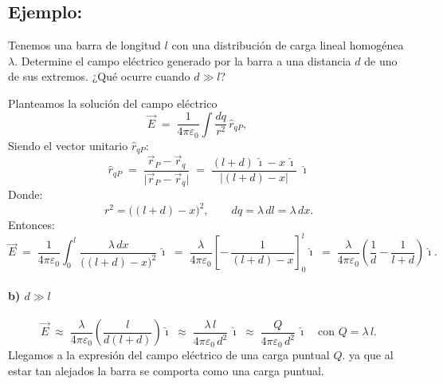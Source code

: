 \documentclass[a4paper,12pt]{article}
\begin{document}
\subsection*{Ejemplo:}

Tenemos una barra de longitud $l$ con una distribución de carga lineal homogénea $\lambda$.
Determine el campo eléctrico generado por la barra a una distancia $d$ de uno de sus extremos.
¿Qué ocurre cuando $d \gg l$?

\begin{center}
\end{center}
Planteamos la solución del campo eléctrico
\[
\vec E \;=\; \frac{1}{4\pi\varepsilon_0}\int \frac{dq}{r^2}\,\hat r_{qP},
\qquad
\]
Siendo el vector unitario $\hat{r}_{qP}$:
\[
\hat r_{qP} \;=\; \frac{\vec r_P-\vec r_q}{\lvert \vec r_P-\vec r_q\rvert}
\;=\; \frac{(l+d)\,\hat{\imath}-x\,\hat{\imath}}{\lvert (l+d)-x\rvert}
\; \hat{\imath}
\]
Donde:
\[
r^2 = \bigl((l+d)-x\bigr)^2,
\qquad
dq = \lambda\,dl = \lambda\,dx.
\]
Entonces:
\[
\vec E \;=\; \frac{1}{4\pi\varepsilon_0}\int_{0}^{l}
\frac{\lambda\,dx}{\bigl((l+d)-x\bigr)^2}\,\hat{\imath}
\;=\;
\frac{\lambda}{4\pi\varepsilon_0}\left[ -\,\frac{1}{(l+d)-x} \right]_{0}^{l}\hat{\imath}
\;=\;
\frac{\lambda}{4\pi\varepsilon_0}\!\left(\frac{1}{d}-\frac{1}{l+d}\right)\hat{\imath}.
\]

\paragraph*{b) $d\gg l$}
\[
\vec E \;\approx\; \frac{\lambda}{4\pi\varepsilon_0}\left(\frac{l}{d(l+d)}\right)\hat{\imath}
\;\approx\; \frac{\lambda\,l}{4\pi\varepsilon_0\,d^{2}}\,\hat{\imath}
\;\approx\; \frac{Q}{4\pi\varepsilon_0\,d^{2}}\,\hat{\imath}
\quad\text{con } Q=\lambda\,l.
\]
Llegamos a la expresión del campo eléctrico de una carga puntual $Q$. ya que al estar tan alejados la barra se comporta como una carga puntual.
\end{document}
